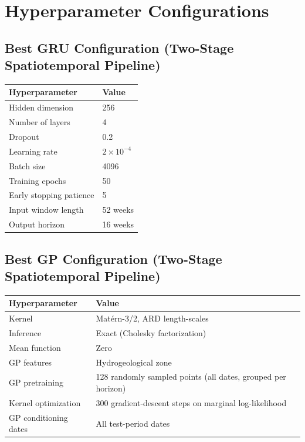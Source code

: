 \chapter{Hyperparameter Configurations}
\label{app:hyperparameters}

\section{Best GRU Configuration (Two-Stage Spatiotemporal Pipeline)}
\label{app:gru_hpo}

\begin{table}[htbp]
\centering
\begin{tabular}{ll}
\toprule
\textbf{Hyperparameter} & \textbf{Value} \\
\midrule
Hidden dimension        & 256 \\
Number of layers        & 4 \\
Dropout                 & 0.2 \\
Learning rate           & $2 \times 10^{-4}$ \\
Batch size              & 4096 \\
Training epochs         & 50 \\
Early stopping patience & 5 \\
Input window length     & 52 weeks \\
Output horizon          & 16 weeks \\
\bottomrule
\end{tabular}
\end{table}

\section{Best GP Configuration (Two-Stage Spatiotemporal Pipeline)}
\label{app:gp_hpo}

\begin{table}[htbp]
\centering
\begin{tabular}{ll}
\toprule
\textbf{Hyperparameter} & \textbf{Value} \\
\midrule
Kernel                  & Matérn-3/2, ARD length-scales \\
Inference               & Exact (Cholesky factorization) \\
Mean function           & Zero \\
GP features             & Hydrogeological zone \\
GP pretraining          & 128 randomly sampled points (all dates, grouped per horizon) \\
Kernel optimization     & 300 gradient-descent steps on marginal log-likelihood \\
GP conditioning dates   & All test-period dates \\
\bottomrule
\end{tabular}
\end{table}

